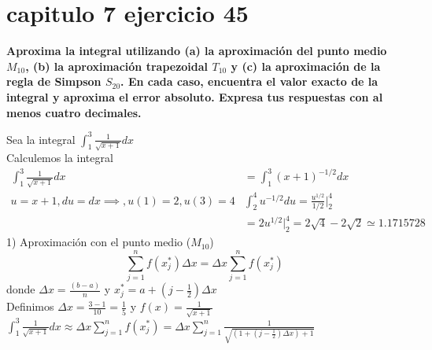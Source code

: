 \chapter*{capitulo 7 ejercicio 45}
\textbf{Aproxima la integral utilizando (a) la aproximación del punto medio $M_{10}$, (b) la aproximación trapezoidal $T_{10}$ y (c) la aproximación de la regla de Simpson $S_{20}$. En cada caso, encuentra el valor exacto de la integral y aproxima el error absoluto. Expresa tus respuestas con al menos cuatro decimales.}

Sea la integral $\displaystyle \int_{1}^{3}\frac{1}{\sqrt{x+1}}dx$\\
Calculemos la integral
\begin{align*}
	\int_{1}^{3}\frac{1}{\sqrt{x+1}}dx & =\int_{1}^{3}(x+1)^{-1/2}dx                             \\
	u=x+1, du=dx\implies,u(1)=2,u(3)=4 & \int_{2}^{4}u^{-1/2}du=\frac{u^{1/2}}{1/2}\bigg|_2^4    \\
	                                   & =2u^{1/2}\bigg|_2^4=2\sqrt{4}-2\sqrt{2}\simeq 1.1715728
\end{align*}
1) Aproximación con el punto medio ($M_{10}$)
\[\sum_{j=1}^{n}f(x^*_j)\Delta x=\Delta x\sum_{j=1}^{n}f(x^*_j)\]
donde $\Delta x = \frac{(b-a)}{n}$ y $x_j^*=a+(j-\frac{1}{2})\Delta x$\\
Definimos $\Delta x =\frac{3-1}{10}=\frac{1}{5}$ y $f(x)=\frac{1}{\sqrt{x+1}}$\\
$\displaystyle \int_{1}^{3}\frac{1}{\sqrt{x+1}}dx\approx \Delta x\sum_{j=1}^{n}f(x_j^*)=\Delta x\sum_{j=1}^{n}\frac{1}{\sqrt{(1+(j-\frac{1}{2})\Delta x)+1}}$

